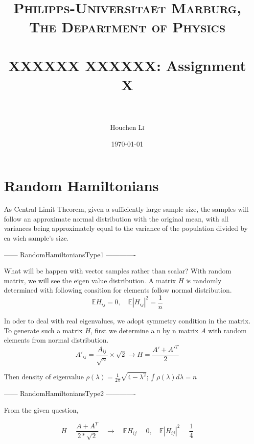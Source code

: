 \documentclass[paper=a4, fontsize=11pt]{scrartcl} %
\title{	
	\normalfont \normalsize 
	\textsc{Philipps-Universitaet Marburg, The Department of Physics} \\ [25pt] %
	\horrule{0.5pt} \\[0.4cm] %
	\huge XXXXXX XXXXXX: Assignment X \\ %
	\horrule{2pt} \\[0.5cm] %
}
\author{Houchen \textsc{Li}} %
\date{\normalsize\today} %
\numberwithin{equation}{section} %
\numberwithin{figure}{section} %
\numberwithin{table}{section} %
\begin{document}
\maketitle %


\section{Random Hamiltonians}

As Central Limit Theorem, given a sufficiently large sample size, the samples will follow an approximate normal distribution with the original mean, with all variances being approximately equal to the variance of the population divided by ea wich sample's size.


\vspace{2em}

------ RandomHamiltoniansType1 -------------

What will be happen with vector samples rather than scalar? With random matrix, we will see the eigen value distribution. A matrix $H$ is randomly determined with following consition for elements follow normal distribution.
\begin{equation}
  \mathbb{E}H_{ij} = 0, \quad \mathbb{E}|H_{ij}|^2 = \frac{1}{n} 
\end{equation}

In oder to deal with real eigenvalues, we adopt symmetry condition in the matrix. To generate such a matrix $H$, first we determine a n by n matrix $A$ with random elements from normal distribution.
\begin{equation}
  \label{eq:2}
  A'_{ij} = \frac{A_{ij}}{\sqrt{n}} \times \sqrt{2} \rightarrow H = \frac{A' + A'^{T}}{2}
\end{equation}

Then density of eigenvalue $ \rho(\lambda) = \frac{1}{2\pi}\sqrt{4-\lambda^2} ; \int \rho(\lambda) d \lambda= n$

\vspace{2em}

------ RandomHamiltoniansType2 -------------


From the given question,

\begin{equation}
  \label{eq:2}
  H = \frac{A + A^{T}}{2*\sqrt{2}} \quad \rightarrow  \quad  \mathbb{E}H_{ij} = 0, \quad \mathbb{E}|H_{ij}|^2 = \frac{1}{4}
\end{equation}
\end{document}
